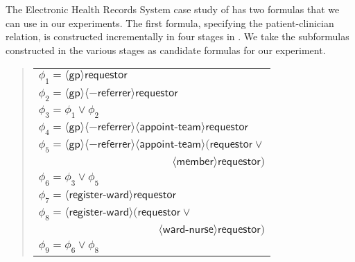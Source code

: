 \documentclass{acm_proc_article-sp}
\begin{document}
The Electronic Health Records System case study of \cite[\S
5]{Fong:2011} has two formulas that we can use in our experiments.
The first formula, specifying the patient-clinician relation, is
constructed incrementally in four stages in \cite[\S 5.1]{Fong:2011}.
We take the subformulas constructed in the various stages as candidate
formulas for our experiment.
\begin{quote}
\begin{tabular}{l} 
$\phi_1 = \langle \mathsf{gp} \rangle
\mathsf{requestor}$ \\
$\phi_2 = \langle \mathsf{gp} \rangle
   \langle -\mathsf{referrer} \rangle \mathsf{requestor}$\\
$\phi_3 = \phi_1 \lor \phi_2$ \\
$\phi_4 = \langle \mathsf{gp} \rangle
    \langle -\mathsf{referrer} \rangle
    \langle \mathsf{appoint\textsf{-}team} \rangle 
  \mathsf{requestor}$\\
$\phi_5 = \langle \mathsf{gp} \rangle
    \langle -\mathsf{referrer} \rangle
    \langle \mathsf{appoint\textsf{-}team} \rangle 
    ( 
  \mathsf{requestor} \lor \mbox{}$\\
  \multicolumn{1}{r}{
  $\langle \mathsf{member} 
   \rangle \mathsf{requestor})$} \\
$\phi_6 = \phi_3 \lor \phi_5$ \\
$\phi_7 = \langle \textsf{register-ward} \rangle 
  \mathsf{requestor}$\\
$\phi_8 = \langle \textsf{register-ward} \rangle 
  (\mathsf{requestor} \lor \mbox{}$\\
\multicolumn{1}{r}{
  $\langle \mathsf{ward\textsf{-}nurse} \rangle 
  \mathsf{requestor})$}\\
$\phi_9 = \phi_6 \lor \phi_8$ 
\end{tabular}
\end{quote}
\begin{comment}
\begin{gather*}
\phi_1 = \langle \mathsf{gp} \rangle
\mathsf{requestor} \\
\phi_2 = \langle \mathsf{gp} \rangle
   \langle -\mathsf{referrer} \rangle \mathsf{requestor}\\
\phi_3 = \phi_1 \lor \phi_2 \\
\phi_4 = \langle \mathsf{gp} \rangle
    \langle -\mathsf{referrer} \rangle
    \langle \mathsf{appoint\textsf{-}team} \rangle 
  \mathsf{requestor}\\
\phi_5 = \langle \mathsf{gp} \rangle
    \langle -\mathsf{referrer} \rangle
    \langle \mathsf{appoint\textsf{-}team} \rangle 
    ( 
  \mathsf{requestor} \lor \mbox{}\\
  \hspace{1in} 
  \langle \mathsf{member} 
   \rangle \mathsf{requestor}) \\
\phi_6 = \phi_3 \lor \phi_5 \\
\phi_7 = \langle \textsf{register-ward} \rangle 
  \mathsf{requestor}\\
\phi_8 = \langle \textsf{register-ward} \rangle 
  (\mathsf{requestor} \lor
  \langle \mathsf{ward\textsf{-}nurse} \rangle 
  \mathsf{requestor})\\
\phi_9 = \phi_6 \lor \phi_8 
\end{gather*}
\end{comment}
\end{document}
